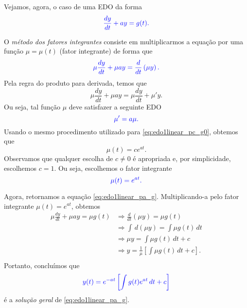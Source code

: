 Vejamos, agora, o caso de uma EDO da forma
\begin{equation}\label{eq:edo1linear_pa_g}
  \color{blue}{\frac{dy}{dt} + ay = g(t).}
\end{equation}

O \emph{método dos fatores integrantes} consiste em multiplicarmos a equação por uma função $\mu = \mu(t)$ (fator integrante) de forma que
\begin{equation}
  \color{blue}{\mu\frac{dy}{dt} + \mu ay = \frac{d}{dt}\left(\mu y\right).}
\end{equation}
Pela regra do produto para derivada, temos que
\begin{equation}
  \mu\frac{dy}{dt} + \mu ay = \mu\frac{dy}{dt} + \mu'y.
\end{equation}
Ou seja, tal função $\mu$ deve satisfazer a seguinte EDO
\begin{equation}
  \color{blue}{\mu' = a\mu.}
\end{equation}
Usando o mesmo procedimento utilizado para \eqref{eq:edo1linear_pc_g0}, obtemos que
\begin{equation}
  \mu(t) = ce^{at}.
\end{equation}
Observamos que qualquer escolha de $c\neq 0$ é apropriada e, por simplicidade, escolhemos $c=1$. Ou seja, escolhemos o fator integrante
\begin{equation}
  \color{blue}{\mu(t) = e^{at}}.
\end{equation}

Agora, retornamos a equação \eqref{eq:edo1linear_pa_g}. Multiplicando-a pelo fator integrante $\mu(t) = e^{at}$, obtemos
\begin{align}
  \mu\frac{dy}{dt} + \mu a y = \mu g(t) &\Rightarrow \frac{d}{dt}\left(\mu y\right) = \mu g(t) \\
                                        &\Rightarrow \int \,d(\mu y) = \int \mu g(t)\,dt \\
                                        &\Rightarrow \mu y = \int \mu g(t)\,dt + c \\
                                        &\Rightarrow y = \frac{1}{\mu}\left[\int \mu g(t)\,dt + c\right]. \\
\end{align}
Portanto, concluímos que
\begin{equation}
  \color{blue}{y(t) = e^{-at}\left[\int g(t)e^{at}\,dt + c\right]}
\end{equation}
é a \emph{solução geral} de \eqref{eq:edo1linear_pa_g}.

